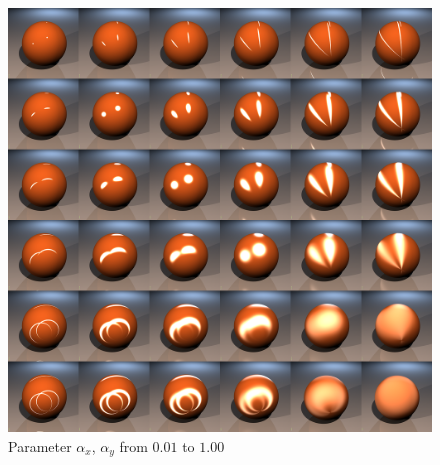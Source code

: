 \documentclass[11pt]{beamer}
\begin{document}
\begin{frame}[allowframebreaks]
\begin{figure}[H]
\includegraphics[height=\textheight]{../warduvcomplete.png}
\caption{Parameter $\alpha_x$, $\alpha_y$ from $0.01$ to $1.00$}
\end{figure}

\end{frame}
\end{document}
